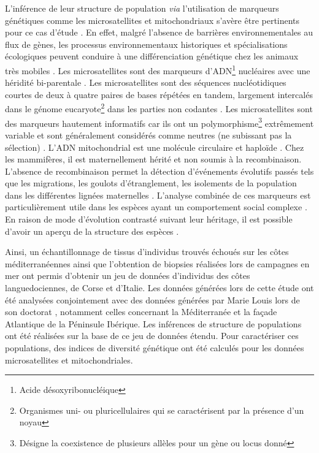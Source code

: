 \documentclass[a4paper,12pt,twoside]{article}\usepackage[]{graphicx}\usepackage[]{color}
\begin{document}
\begin {bibunit} [newbst]
L'inférence de leur structure de population \emph{via} l'utilisation de marqueurs génétiques comme les microsatellites et mitochondriaux s'avère être pertinents pour ce cas d'étude \citep{natoli2004molecular}. En effet, malgré l'absence de barrières environnementales au flux de gènes, les processus environnementaux historiques et spécialisations écologiques peuvent conduire à une différenciation génétique chez les animaux très mobiles \citep{natoli2005habitat, louis2014}. Les microsatellites sont des marqueurs d'ADN\footnote{Acide désoxyribonucléique} nucléaires avec une héridité bi-parentale \citep{jarne1996microsatellites}. Les microsatellites sont des séquences nucléotidiques courtes de deux à quatre paires de bases répétées en tandem, largement intercalés dans le génome eucaryote\footnote{Organismes uni- ou pluricellulaires qui se caractérisent par la présence d'un noyau} dans les parties non codantes \citep{estoup2002homoplasy}. Les microsatellites sont des marqueurs hautement informatifs car ils ont un polymorphisme\footnote{Désigne la coexistence de plusieurs allèles pour un gène ou locus donné} extrêmement variable et sont généralement considérés comme neutres (ne subissant pas la sélection) \citep{jarne1996microsatellites}. L'ADN mitochondrial est une molécule circulaire et haploïde \citep{avise1987intraspecific}. Chez les mammifères, il est maternellement hérité et non soumis à la recombinaison. L'absence de recombinaison permet la détection d'événements évolutifs passés tels que les migrations, les goulots d'étranglement, les isolements de la population dans les différentes lignées maternelles \citep{avise1987intraspecific, excoffier1992analysis}. L'analyse combinée de ces marqueurs est particulièrement utile dans les espèces ayant un comportement social complexe \citep{natoli2004molecular}. En raison de mode d'évolution contrasté suivant leur héritage, il est possible d'avoir un aperçu de la structure des espèces \citep{natoli2005habitat}.

Ainsi, un échantillonnage de tissus d'individus trouvés échoués sur les côtes méditerranéennes ainsi que l'obtention de biopsies réalisées lors de campagnes en mer ont permis d'obtenir un jeu de données d'individus des côtes languedociennes, de Corse et d’Italie. Les données générées lors de cette étude ont été analysées conjointement avec des données générées par Marie Louis lors de son doctorat \citep{phdLouis2014}, notamment celles concernant la Méditerranée et la façade Atlantique de la Péninsule Ibérique. Les inférences de structure de populations ont été réalisées sur la base de ce jeu de données étendu. Pour caractériser ces populations, des indices de diversité génétique ont été calculés pour les données microsatellites et mitochondriales.


\end{bibunit}
\end{document}
